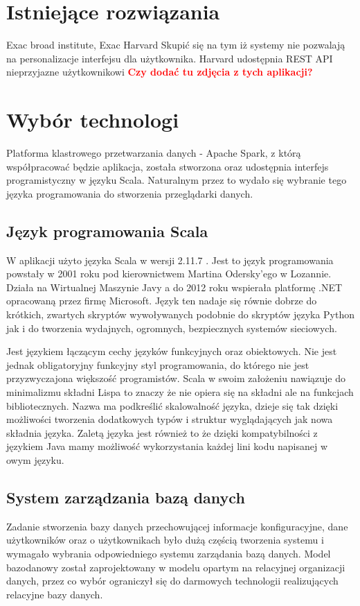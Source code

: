 \documentclass[a4paper,12pt,twoside]{article}
\begin{document}
\newpage
\section{Istniejące rozwiązania}  

Exac broad institute, Exac Harvard  
Skupić się na tym iż systemy nie pozwalają na personalizacje interfejsu dla użytkownika.
Harvard udostępnia REST API nieprzyjazne użytkownikowi \newline
\textcolor{red}{\textbf{Czy dodać tu zdjęcia z tych aplikacji?}}

\newpage
\section{Wybór technologi}

Platforma klastrowego przetwarzania danych - Apache Spark\cite{spark}, z którą współpracować będzie aplikacja, została stworzona oraz udostępnia interfejs programistyczny w języku Scala.
Naturalnym przez to wydało się wybranie tego języka programowania do stworzenia przeglądarki danych.

  
\subsection{Język programowania Scala}
W aplikacji użyto języka Scala w wersji 2.11.7 \cite{jezykScala}. Jest to język programowania powstały w 2001 roku pod kierownictwem Martina Odersky'ego w Lozannie.
Działa na Wirtualnej Maszynie Javy a do 2012 roku wspierała platformę .NET opracowaną przez firmę Microsoft. Język ten nadaje się równie dobrze do krótkich, zwartych skryptów  wywoływanych podobnie do skryptów języka Python jak i do tworzenia wydajnych, ogromnych, bezpiecznych systemów sieciowych.

Jest językiem łączącym cechy języków funkcyjnych oraz obiektowych. 
Nie jest jednak obligatoryjny funkcyjny styl programowania, do którego nie jest przyzwyczajona większość programistów.
 Scala w swoim założeniu nawiązuje do minimalizmu składni Lispa to znaczy że nie opiera się na składni ale na funkcjach bibliotecznych. Nazwa ma podkreślić skalowalność języka, dzieje się tak dzięki możliwości tworzenia dodatkowych typów i struktur wyglądających jak nowa składnia języka.
Zaletą języka jest również to że dzięki kompatybilności z językiem Java mamy możliwość wykorzystania każdej lini kodu napisanej w owym języku.

\subsection{System zarządzania bazą danych}  
Zadanie stworzenia bazy danych przechowującej informacje konfiguracyjne, dane użytkowników oraz o użytkownikach było dużą częścią tworzenia systemu i
wymagało wybrania odpowiedniego systemu zarządania bazą danych.
Model bazodanowy został zaprojektowany w modelu opartym na relacyjnej organizacji danych, przez co wybór ograniczył się do
darmowych technologii realizujących relacyjne bazy danych.
\end{document}
